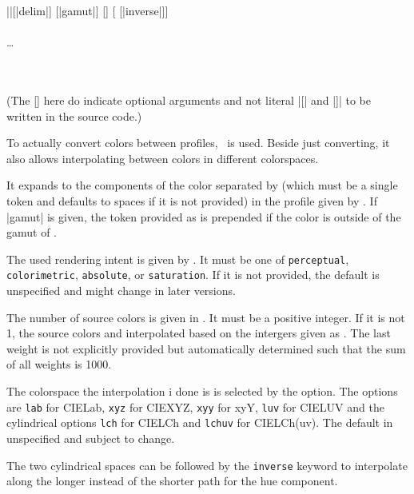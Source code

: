 \documentclass{l3doc}
\begin{document}
\begin{documentation}
\begin{function}{\ApplyProfile}
  \begin{syntax}
    |\ProfileInfo |[|delim|] [|gamut|] [] [ [|inverse|]]  \\
      \\
    \dots\\
      \\
     \\
  \end{syntax}
  (The [] here do indicate optional arguments and not literal |[| and |]| to be written in the source code.)

  To actually convert colors between profiles, \cmd\ApplyProfile\ is used. Beside just converting, it also allows interpolating between colors in different colorspaces.

  It expands to the components of the color separated by  (which must be a single token and defaults to spaces if it is not provided) in the profile given by .
  If |gamut| is given, the token provided as  is prepended if the color is outside of the gamut of .

  The used rendering intent is given by . It must be one of \texttt{perceptual}, \texttt{colorimetric}, \texttt{absolute}, or \texttt{saturation}. If it is not provided, the default is unspecified and might change in later versions.

  The number of source colors is given in .
  It must be a positive integer.
  If it is not 1, the source colors and interpolated based on the intergers given as .
  The last weight is not explicitly provided but automatically determined such that the sum of all weights is 1000.

  The colorspace the interpolation i done is is selected by the  option. The options are \texttt{lab} for CIELab, \texttt{xyz} for CIEXYZ, \texttt{xyy} for xyY, \texttt{luv} for CIELUV and the cylindrical options \texttt{lch} for CIELCh and \texttt{lchuv} for CIELCh(uv). The default in unspecified and subject to change.

  The two cylindrical spaces can be followed by the \texttt{inverse} keyword to interpolate along the longer instead of the shorter path for the hue component.


\end{function}
\end{documentation}
\end{document}
